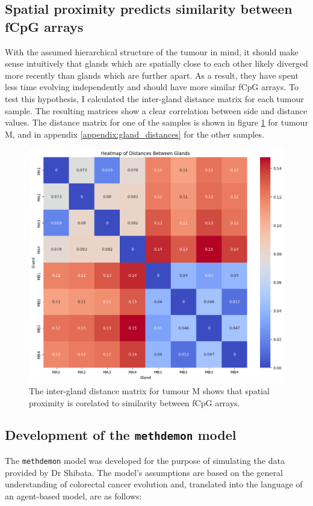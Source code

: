 \subsection{Spatial proximity predicts similarity between fCpG arrays}
With the assumed hierarchical structure of the tumour in mind, it should make
sense intuitively that glands which are spatially close to each other likely
diverged more recently than glands which are further apart. As a result, they
have spent less time evolving independently and should have more similar fCpG
arrays. To test this hypothesis, I calculated the inter-gland distance matrix
for each tumour sample. The resulting matrices show a clear correlation between
side and distance values. The distance matrix for one of the samples is shown
in figure \ref{fig:gland_dist_M} for tumour M, and in appendix
\ref{appendix:gland_distances} for the other samples.

\begin{figure}[h]
    \centering
    \includegraphics[width=\textwidth]{Chapter_5/figures/gland_dist_M.png}
    \caption{The inter-gland distance matrix for tumour M shows that spatial
    proximity is corelated to similarity between fCpG arrays.}
    \label{fig:gland_dist_M}
\end{figure}

\subsection{Development of the \texttt{methdemon} model}
The \texttt{methdemon} model was developed for the purpose of simulating the
data provided by Dr Shibata. The model's assumptions are based on the general
understanding of colorectal cancer evolution and, translated into the language
of an agent-based model, are as follows:

